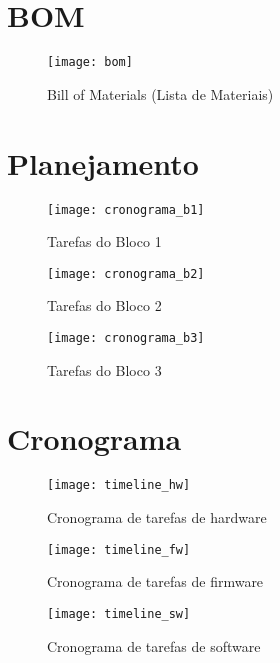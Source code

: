 \documentclass[../monografia.tex]{subfiles}
\begin{document}
\chapter{BOM}
\begin{figure}[h]
\centering
    \texttt{[image: bom]}
    \label{fig:img1}
    \caption{Bill of Materials (Lista de Materiais)}
\end{figure}

\chapter{Planejamento}
\begin{figure}[h]
    \centering
        \texttt{[image: cronograma\_b1]}
        \label{fig:b1}
        \caption{Tarefas do Bloco 1}
\end{figure}
\begin{figure}[h]
    \centering
        \texttt{[image: cronograma\_b2]}
        \label{fig:b2}
        \caption{Tarefas do Bloco 2}
\end{figure}
\begin{figure}[h]
    \centering
        \texttt{[image: cronograma\_b3]}
        \label{fig:b3}
        \caption{Tarefas do Bloco 3}
\end{figure}

\chapter{Cronograma}

\begin{figure}[h]
    \centering
        \texttt{[image: timeline\_hw]}
        \label{fig:hw}
        \caption{Cronograma de tarefas de hardware}
\end{figure}

\begin{figure}[h]
    \centering
        \texttt{[image: timeline\_fw]}
        \label{fig:fw}
        \caption{Cronograma de tarefas de firmware}
\end{figure}

\begin{figure}[h]
    \centering
        \texttt{[image: timeline\_sw]}
        \label{fig:sw}
        \caption{Cronograma de tarefas de software}
\end{figure}
\end{document}
